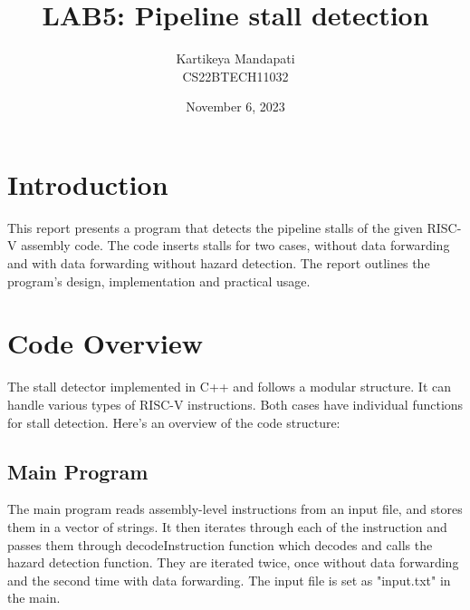 \documentclass{article}
\title{\textbf{LAB5: Pipeline stall detection}}
\author{Kartikeya Mandapati \\CS22BTECH11032}
\date{November 6, 2023}
\begin{document}
\maketitle


\section{Introduction}
This report presents a program that detects the pipeline stalls of the given RISC-V assembly code. The code inserts stalls for two cases, without data forwarding and with data forwarding without hazard detection. The report outlines the program's design, implementation and practical usage.
\section{Code Overview}
The stall detector implemented in C++ and follows a modular structure. It can handle various types of RISC-V instructions. Both cases have individual functions for stall detection. Here's an overview of the code structure:

\subsection{Main Program}
The main program reads assembly-level instructions from an input file, and stores them in a vector of strings. It then iterates through each of the instruction and passes them through decodeInstruction function which decodes and calls the hazard detection function. They are iterated twice, once without data forwarding and the second time with data forwarding. The input file is set as "input.txt" in the main. 
\end{document}
